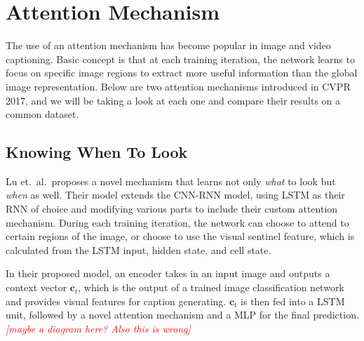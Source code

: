 \documentclass[10pt,twocolumn,letterpaper]{article}
\newcommand{\todo}[1]{\textcolor{red}{{\em [#1]}} }
\newcommand{\bs}[1]{\boldsymbol{#1}}
\begin{document}
\section{Attention Mechanism}

The use of an attention mechanism has become popular in image and video
captioning. Basic concept is that at each training iteration, the network
learns to focus on specific image regions to extract more useful information
than the global image representation. Below are two attention mechanisms
introduced in CVPR 2017, and we will be taking a look at each one and compare
their results on a common dataset.

\subsection{Knowing When To Look}
Lu et.\ al.\ proposes a novel mechanism that learns not only \textit{what} to
look but \textit{when} as well. Their model extends the CNN-RNN model,
using LSTM as their RNN of choice and modifying various parts to include their
custom attention mechanism. During each training iteration, the network can
choose to attend to certain regions of the image, or choose to use the visual
sentinel feature, which is calculated from the LSTM input, hidden state, and
cell state.

In their proposed model, an
encoder takes in an input image and outputs a context vector $\bs{c}_t$, which
is the output of a trained image classification network and provides visual
features for caption generating.  $\bs{c}_t$ is then fed into a LSTM unit,
followed by a novel attention mechanism and a MLP for the final prediction.
\todo{maybe a diagram here? Also
this is wrong}
\end{document}
